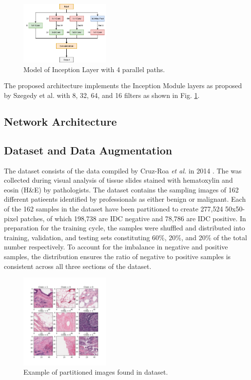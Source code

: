 \documentclass[conference]{IEEEtran}
\begin{document}
\begin{figure}
\centering
\includegraphics[width=0.4\textwidth]{figures/Inception_Model.png}
\caption{Model of Inception Layer with 4 parallel paths.}
\label{Inception_Model}
\end{figure}

The proposed architecture implements the Inception Module layers as proposed by Szegedy {et al.} with 8, 32, 64, and 16 filters as shown in Fig. \ref{Inception_Model}. 

\subsection{Network Architecture}
\subsection{Dataset and Data Augmentation}
The dataset consists of the data compiled by Cruz-Roa \emph{et al.} in 2014 \cite{Cruz-Roa2014}. The was collected during visual analysis of tissue slides stained with hematoxylin and eosin (H\&E) by pathologists. The dataset contains the sampling images of 162 different patieents identified by professionals as either benign or malignant. Each of the 162 samples in the dataset have been partitioned to create 277,524 50x50-pixel patches, of which 198,738 are IDC negative and 78,786 are IDC positive. In preparation for the training cycle, the samples were shuffled and distributed into training, validation, and testing sets constituting 60\%, 20\%, and 20\% of the total number respectively. To account for the imbalance in negative and positive samples, the distribution  ensures the ratio of negative to positive samples is consistent across all three sections of the dataset.

\begin{figure}
\centering
\includegraphics[width=0.4\textwidth]{figures/dataset_example.png}
\caption{Example of partitioned images found in dataset.}
\label{dataset_example}
\end{figure}
\end{document}
